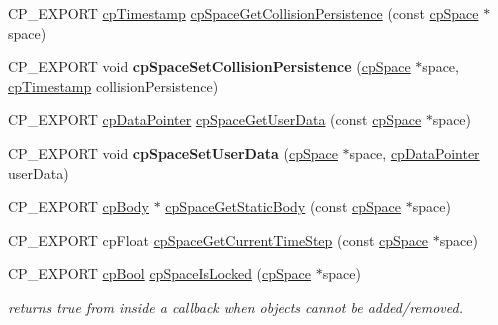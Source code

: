 \begin{DoxyCompactItemize}
\item 
C\+P\+\_\+\+E\+X\+P\+O\+RT \hyperlink{group__basicTypes_gaa24652c104082d0725066ea5ac7dc83f}{cp\+Timestamp} \hyperlink{group__cpSpace_gac20dad9f3ef05f468773db3d7667c9ba}{cp\+Space\+Get\+Collision\+Persistence} (const \hyperlink{structcpSpace}{cp\+Space} $\ast$space)
\item 
\mbox{\label{group__cpSpace_ga49cd660a485d0d963f66f8333b2da788}} 
C\+P\+\_\+\+E\+X\+P\+O\+RT void {\bfseries cp\+Space\+Set\+Collision\+Persistence} (\hyperlink{structcpSpace}{cp\+Space} $\ast$space, \hyperlink{group__basicTypes_gaa24652c104082d0725066ea5ac7dc83f}{cp\+Timestamp} collision\+Persistence)
\item 
C\+P\+\_\+\+E\+X\+P\+O\+RT \hyperlink{group__basicTypes_ga2ac2c3c31e21893941f9e4f8ee279447}{cp\+Data\+Pointer} \hyperlink{group__cpSpace_ga20f6bbc8db7698065052f4502050dc52}{cp\+Space\+Get\+User\+Data} (const \hyperlink{structcpSpace}{cp\+Space} $\ast$space)
\item 
\mbox{\label{group__cpSpace_ga510319d0cc108e33cc5ee8b9cc39d449}} 
C\+P\+\_\+\+E\+X\+P\+O\+RT void {\bfseries cp\+Space\+Set\+User\+Data} (\hyperlink{structcpSpace}{cp\+Space} $\ast$space, \hyperlink{group__basicTypes_ga2ac2c3c31e21893941f9e4f8ee279447}{cp\+Data\+Pointer} user\+Data)
\item 
C\+P\+\_\+\+E\+X\+P\+O\+RT \hyperlink{structcpBody}{cp\+Body} $\ast$ \hyperlink{group__cpSpace_gaaf1306bc87ee883855311aabafb10363}{cp\+Space\+Get\+Static\+Body} (const \hyperlink{structcpSpace}{cp\+Space} $\ast$space)
\item 
C\+P\+\_\+\+E\+X\+P\+O\+RT cp\+Float \hyperlink{group__cpSpace_gad4819cd09e4590b60eea6b6dc8b4cf80}{cp\+Space\+Get\+Current\+Time\+Step} (const \hyperlink{structcpSpace}{cp\+Space} $\ast$space)
\item 
\mbox{\label{group__cpSpace_gad72c9085853f1d612226ec7b6faca362}} 
C\+P\+\_\+\+E\+X\+P\+O\+RT \hyperlink{group__basicTypes_gabc5e752c48f3449ca26ef413ecbd647e}{cp\+Bool} \hyperlink{group__cpSpace_gad72c9085853f1d612226ec7b6faca362}{cp\+Space\+Is\+Locked} (\hyperlink{structcpSpace}{cp\+Space} $\ast$space)
\begin{DoxyCompactList}\small\item\em returns true from inside a callback when objects cannot be added/removed. \end{DoxyCompactList}\item 

\end{DoxyCompactItemize}
